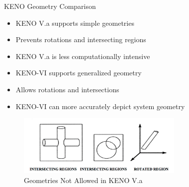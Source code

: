 
\begin{frame}{KENO Geometry Comparison}

\begin{itemize}
\item KENO V.a supports simple geometries
\item Prevents rotations and intersecting regions
\item KENO V.a is less computationally intensive
\vspace{3mm}
\item KENO-VI supports generalized geometry
\item Allows rotations and intersections
\item KENO-VI can more accurately depict system geometry

\end{itemize}

\begin{figure}
    \centering
    \includegraphics[width=8cm]{figures/notAllowedK5.png}
    \caption{Geometries Not Allowed in KENO V.a}
    \label{fig:geom_comp}
\end{figure}

\end{frame}
